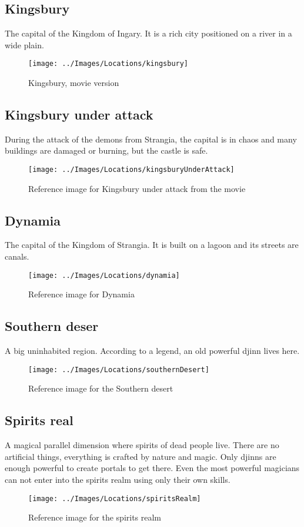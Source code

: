 \subsection{Kingsbury}
	The capital of the Kingdom of Ingary. It is a rich city positioned on a river in a wide plain.
	\begin{figure}[H]
	  \centering
	  \texttt{[image: ../Images/Locations/kingsbury]}
	  \caption{Kingsbury, movie version}
	\end{figure}

\subsection{Kingsbury under attack}
	During the attack of the demons from Strangia, the capital is in chaos and many buildings are damaged or burning, but the castle is safe.
	\begin{figure}[H]
	  \centering
	  \texttt{[image: ../Images/Locations/kingsburyUnderAttack]}
	  \caption{Reference image for Kingsbury under attack from the movie}
	\end{figure}

\subsection{Dynamia}
	The capital of the Kingdom of Strangia. It is built on a lagoon and its streets are canals.
	\begin{figure}[H]
	  \centering
	  \texttt{[image: ../Images/Locations/dynamia]}
	  \caption{Reference image for Dynamia}
	\end{figure}
	
\subsection{Southern deser}
	A big uninhabited region. According to a legend, an old powerful djinn lives here.
	\begin{figure}[H]
	  \centering
	  \texttt{[image: ../Images/Locations/southernDesert]}
	  \caption{Reference image for the Southern desert}
	\end{figure}

\subsection{Spirits real}
	A magical parallel dimension where spirits of dead people live. There are no artificial things, everything is crafted by nature and magic. Only djinns are enough powerful to create portals to get there. Even the most powerful magicians can not enter into the spirits realm using only their own skills.
	\begin{figure}[H]
	  \centering
	  \texttt{[image: ../Images/Locations/spiritsRealm]}
	  \caption{Reference image for the spirits realm}
	\end{figure}

